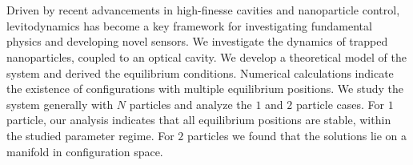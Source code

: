 \chapter*{\abstractname}
\label{abstract}

Driven by recent advancements in high-finesse cavities and nanoparticle control, levitodynamics has become a key framework for investigating fundamental physics and developing novel sensors.
We investigate the dynamics of trapped nanoparticles,
    coupled to an optical cavity.
We develop a theoretical model of the system
    and derived the equilibrium conditions.
Numerical calculations indicate the existence of configurations with multiple equilibrium positions.
We study the system generally with $N$ particles 
    and analyze the $1$ and $2$ particle cases.
For $1$ particle, 
    our analysis indicates that all equilibrium positions are stable,
    within the studied parameter regime.
For $2$ particles we found that the solutions lie on a manifold in configuration space.